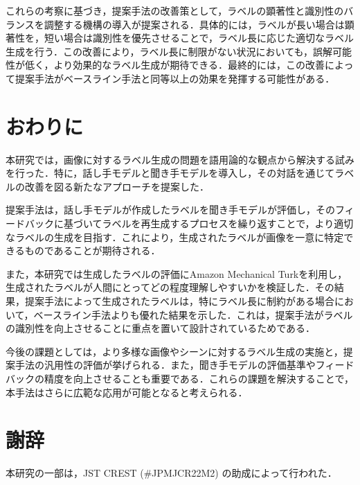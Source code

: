 \documentclass[a4paper,11pt]{jreport}
\begin{document}
これらの考察に基づき，提案手法の改善策として，ラベルの顕著性と識別性のバランスを調整する機構の導入が提案される．具体的には，ラベルが長い場合は顕著性を，短い場合は識別性を優先させることで，ラベル長に応じた適切なラベル生成を行う．この改善により，ラベル長に制限がない状況においても，誤解可能性が低く，より効果的なラベル生成が期待できる．最終的には，この改善によって提案手法がベースライン手法と同等以上の効果を発揮する可能性がある．


\chapter{おわりに}

本研究では，画像に対するラベル生成の問題を語用論的な観点から解決する試みを行った．特に，話し手モデルと聞き手モデルを導入し，その対話を通じてラベルの改善を図る新たなアプローチを提案した．

提案手法は，話し手モデルが作成したラベルを聞き手モデルが評価し，そのフィードバックに基づいてラベルを再生成するプロセスを繰り返すことで，より適切なラベルの生成を目指す．これにより，生成されたラベルが画像を一意に特定できるものであることが期待される．

また，本研究では生成したラベルの評価にAmazon Mechanical Turkを利用し，生成されたラベルが人間にとってどの程度理解しやすいかを検証した．その結果，提案手法によって生成されたラベルは，特にラベル長に制約がある場合において，ベースライン手法よりも優れた結果を示した．これは，提案手法がラベルの識別性を向上させることに重点を置いて設計されているためである．

今後の課題としては，より多様な画像やシーンに対するラベル生成の実施と，提案手法の汎用性の評価が挙げられる．また，聞き手モデルの評価基準やフィードバックの精度を向上させることも重要である．これらの課題を解決することで，本手法はさらに広範な応用が可能となると考えられる．

\chapter*{謝辞}

本研究の一部は，JST CREST (\#JPMJCR22M2) の助成によって行われた．

\newpage

\renewcommand{\bibname}{参考文献}



\end{document}
